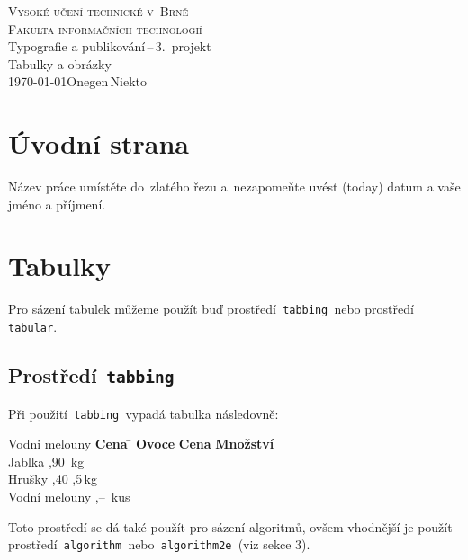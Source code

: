 \documentclass[a4paper, 11pt]{article}
\begin{document}
\begin{titlepage}
	\begin{center}
		{\Huge \textsc{Vysoké učení technické v~Brně}\\}
		{\huge \textsc{Fakulta informačních technologií}\\}
		{\LARGE Typografie a publikování\,--\,3.\ projekt\\}
		{\Huge Tabulky a obrázky\\}
		{\Large \today \hfill Onegen\,Niekto}
	\end{center}
\end{titlepage}

\section{Úvodní strana}

Název práce umístěte do~zlatého řezu a~nezapomeňte uvést  (today)
datum a vaše jméno a příjmení.

\section{Tabulky}

Pro sázení tabulek můžeme použít buď prostředí\texttt{ tabbing }nebo
prostředí\texttt{ tabular}.

\subsection{Prostředí\texttt{ tabbing}}

Při použití\texttt{ tabbing }vypadá tabulka následovně:
%
\begin{tabbing}
	Vodni melouny \quad  \= \textbf{Cena} \quad \=                \kill
	\textbf{Ovoce}       \> \textbf{Cena}       \> \textbf{Množství} \\
	Jablka               ,90               \,kg             \\
	Hrušky               ,40               ,5\,kg           \\
	Vodní melouny        ,--               \,kus            \\
\end{tabbing}

\noindent
Toto prostředí se dá také použít pro sázení algoritmů, ovšem vhodnější je
použít prostředí\texttt{ algorithm }nebo\texttt{ algorithm2e }(viz sekce
3).
\end{document}
